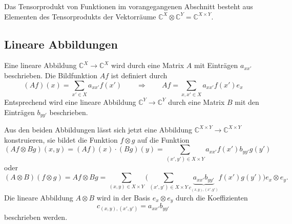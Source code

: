 Das Tensorprodukt von Funktionen im vorangegangenen Abschnitt besteht
aus Elementen des Tensorprodukts der Vektorräume
$\mathbb{C}^X\otimes \mathbb{C}^Y = \mathbb{C}^{X\times Y}$.

%
%
\subsection{Lineare Abbildungen
\label{buch:diskret:tensor:subsection:linabb}}
Eine lineare Abbildung $\mathbb{C}^X\to \mathbb{C}^X$ wird durch eine
Matrix $A$ mit Einträgen $a_{xx'}$ beschrieben.
Die Bildfunktion $Af$ ist definiert durch
\[
(Af)(x) = \sum_{x'\in X}a_{xx'}f(x')
\qquad\Rightarrow\qquad
Af = \sum_{x,x'\in X} a_{xx'}f(x') e_x
\]
Entsprechend wird eine lineare Abbildung $\mathbb{C}^Y\to\mathbb{C}^Y$
durch eine Matrix $B$ mit den Einträgen $b_{yy'}$ beschrieben.

Aus den beiden Abbildungen lässt sich jetzt eine Abbildung 
$\mathbb{C}^{X\times Y} \to \mathbb{C}^{X\times Y}$
konstruieren, sie bildet die Funktion $f\otimes g$ auf die
Funktion
\[
(Af\otimes Bg)(x,y)
=
(Af)(x)\cdot (Bg)(y)
=
\sum_{(x',y')\in X\times Y}
a_{xx'}f(x') b_{yy'}g(y')
\]
oder
\[
(A\otimes B)
(f\otimes g)
=
Af\otimes Bg
=
\sum_{(x,y)\in X\times Y}
\biggl(
\sum_{(x',y')\in X\times Y}
\underbrace{a_{xx'}b_{yy'}}_{c_{\displaystyle (x,y),(x',y')}}
f(x')g(y')
\biggr)
e_x\otimes e_y.
\]
Die lineare Abbildung $A\otimes B$ wird in der Basis $e_x\otimes e_y$
durch die Koeffizienten
\[
c_{(x,y),(x',y')}
=
a_{xx'}b_{yy'}
\]
beschrieben werden.

%
%
